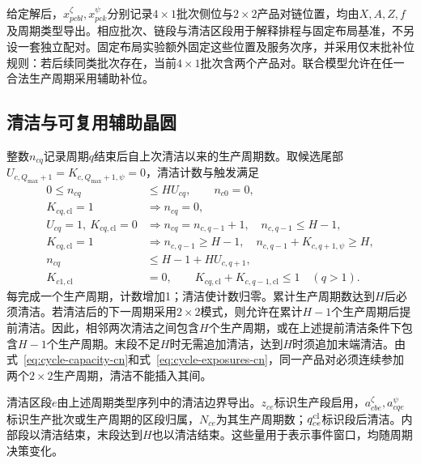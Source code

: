 \documentclass[final,5p,times,twocolumn]{elsarticle}
\begin{document}
给定解后，$x^{\zeta}_{pcbl},x^{\psi}_{pck}$分别记录$4\times1$批次侧位与$2\times2$产品对链位置，均由$X,A,Z,f$及周期类型导出。相应批次、链段与清洁区段用于解释排程与固定布局基准，不另设一套独立配对。固定布局实验额外固定这些位置及服务次序，并采用仅末批补位规则：若后续同类批次存在，当前$4\times1$批次含两个产品对。联合模型允许在任一合法生产周期采用辅助补位。


\subsection{清洁与可复用辅助晶圆}

整数$n_{cq}$记录周期$q$结束后自上次清洁以来的生产周期数。取候选尾部$U_{c,Q_{\max}+1}=K_{c,Q_{\max}+1,\psi}=0$，清洁计数与触发满足
\begin{equation}
\begin{aligned}
0\le n_{cq}&\le H U_{cq},\qquad n_{c0}=0,\\
K_{cq,\mathrm{cl}}=1&\Rightarrow n_{cq}=0,\\
U_{cq}=1,\ K_{cq,\mathrm{cl}}=0
&\Rightarrow n_{cq}=n_{c,q-1}+1,\quad n_{c,q-1}\le H-1,\\
K_{cq,\mathrm{cl}}=1&\Rightarrow n_{c,q-1}\ge H-1,\quad
n_{c,q-1}+K_{c,q+1,\psi}\ge H,\\
n_{cq}&\le H-1+H U_{c,q+1},\\
K_{c1,\mathrm{cl}}&=0,\qquad
K_{cq,\mathrm{cl}}+K_{c,q-1,\mathrm{cl}}\le1\quad(q>1).
\end{aligned}
\label{eq:clean-counter-cn}
\end{equation}
每完成一个生产周期，计数增加1；清洁使计数归零。累计生产周期数达到$H$后必须清洁。若清洁后的下一周期采用$2\times2$模式，则允许在累计$H-1$个生产周期后提前清洁。因此，相邻两次清洁之间包含$H$个生产周期，或在上述提前清洁条件下包含$H-1$个生产周期。末段不足$H$时无需追加清洁，达到$H$时须追加末端清洁。由式~\eqref{eq:cycle-capacity-cn}和式~\eqref{eq:cycle-exposures-cn}，同一产品对必须连续参加两个$2\times2$生产周期，清洁不能插入其间。

清洁区段$e$由上述周期类型序列中的清洁边界导出。$z_{ce}$标识生产段启用，$a^{\zeta}_{cbe},a^{\psi}_{cqe}$标识生产批次或生产周期的区段归属，$N_{ce}$为其生产周期数；$q^{\rm cl}_{ce}$标识段后清洁。内部段以清洁结束，末段达到$H$也以清洁结束。这些量用于表示事件窗口，均随周期决策变化。
\end{document}
